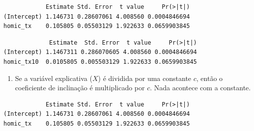 \documentclass[
  letterpaper,
  DIV=11,
  numbers=noendperiod]{scrreprt}
\newenvironment{Shaded}{\begin{snugshade}}{\end{snugshade}}
\newcommand{\AttributeTok}[1]{\textcolor[rgb]{0.40,0.45,0.13}{#1}}
\newcommand{\DecValTok}[1]{\textcolor[rgb]{0.68,0.00,0.00}{#1}}
\newcommand{\FunctionTok}[1]{\textcolor[rgb]{0.28,0.35,0.67}{#1}}
\newcommand{\NormalTok}[1]{\textcolor[rgb]{0.00,0.23,0.31}{#1}}
\newcommand{\OtherTok}[1]{\textcolor[rgb]{0.00,0.23,0.31}{#1}}
\newcommand{\SpecialCharTok}[1]{\textcolor[rgb]{0.37,0.37,0.37}{#1}}
\providecommand{\tightlist}{%
  \setlength{\itemsep}{0pt}\setlength{\parskip}{0pt}}
\begin{document}
\begin{verbatim}
            Estimate Std. Error  t value     Pr(>|t|)
(Intercept) 1.146731 0.28607061 4.008560 0.0004846694
homic_tx    0.105805 0.05503129 1.922633 0.0659903845
\end{verbatim}

\begin{Shaded}
\end{Shaded}

\begin{verbatim}
             Estimate  Std. Error  t value     Pr(>|t|)
(Intercept) 1.1467311 0.286070605 4.008560 0.0004846694
homic_tx10  0.0105805 0.005503129 1.922633 0.0659903845
\end{verbatim}

\begin{enumerate}
\def\labelenumi{\arabic{enumi}.}
\setcounter{enumi}{2}
\tightlist
\item
  Se a variável explicativa (\(X\)) é dividida por uma constante \(c\),
  então o coeficiente de inclinação é multiplicado por \(c\). Nada
  acontece com a constante.
\end{enumerate}

\begin{Shaded}
\end{Shaded}

\begin{verbatim}
            Estimate Std. Error  t value     Pr(>|t|)
(Intercept) 1.146731 0.28607061 4.008560 0.0004846694
homic_tx    0.105805 0.05503129 1.922633 0.0659903845
\end{verbatim}

\begin{Shaded}
\end{Shaded}
\end{document}
